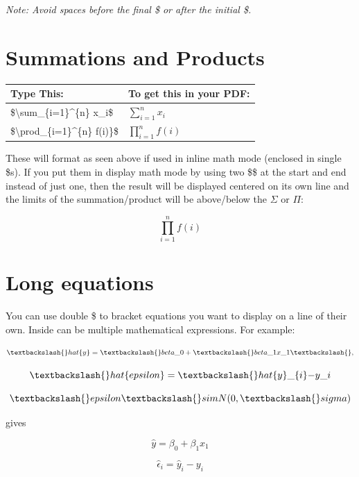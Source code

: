 \documentclass[
  letterpaper,
  DIV=11,
  numbers=noendperiod]{scrreprt}
\newenvironment{Shaded}{\begin{snugshade}}{\end{snugshade}}
\newcommand{\NormalTok}[1]{\textcolor[rgb]{0.00,0.23,0.31}{#1}}
\theoremstyle{remark}
\begin{document}
\emph{Note: Avoid spaces before the final \$ or after the initial \$.}

\section{Summations and Products}\label{summations-and-products}

\begin{longtable}[]{@{}ll@{}}
\toprule\noalign{}
Type This: & To get this in your PDF: \\
\midrule\noalign{}
\endhead
\bottomrule\noalign{}
\endlastfoot
\$\textbackslash sum\_\{i=1\}\^{}\{n\} x\_i\$ &
\(\sum_{i=1}^{n} x_i\) \\
\$\textbackslash prod\_\{i=1\}\^{}\{n\} f(i)\}\$ &
\(\prod_{i=1}^{n} f(i)\) \\
\end{longtable}

These will format as seen above if used in inline math mode (enclosed in
single \$s). If you put them in display math mode by using two \$\$ at
the start and end instead of just one, then the result will be displayed
centered on its own line and the limits of the summation/product will be
above/below the \(\Sigma\) or \(\Pi\):

\[\prod_{i=1}^{n} f(i)\]

\section{Long equations}\label{long-equations}

You can use double \$ to bracket equations you want to display on a line
of their own. Inside can be multiple mathematical expressions. For
example:

\begin{Shaded}
\begin{Highlighting}[]
\NormalTok{$$\textbackslash{}hat\{y\} = \textbackslash{}beta\_0 + \textbackslash{}beta\_1x\_1\textbackslash{},$$}

\NormalTok{$$\textbackslash{}hat\{epsilon\} = \textbackslash{}hat\{y\}\_\{i\} {-} y\_i$$}

\NormalTok{$$\textbackslash{}epsilon \textbackslash{}sim N(0, \textbackslash{}sigma)$$}
\end{Highlighting}
\end{Shaded}

gives

\[\hat{y} = \beta_0 + \beta_1x_1\]

\[\hat{\epsilon}_{i} = \hat{y}_{i} - y_i\]
\end{document}
